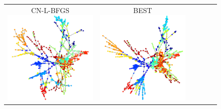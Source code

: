 \documentclass[dvipdfmx,10pt,journal,compsoc]{IEEEtran}
\begin{document}
\begin{figure}[btp]
\begin{tabular}{cccccc}
    \makecell{\small{\textsf{CN-L-BFGS}}                                                                                                                 \\[-0.2em]\includegraphics[width=0.27\columnwidth]{individual/vis/1138_bus_CN-L-BFGS.png}} &
    \makecell{\small{\textsf{BEST}}                                                                                                                      \\[-0.2em]\includegraphics[width=0.27\columnwidth]{individual/vis/opt_1138_bus.png}} \\


\end{tabular}
\end{figure}
\end{document}
